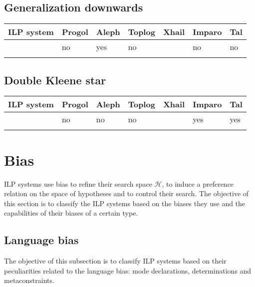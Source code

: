 \subsection{Generalization downwards}
\begin{center}
 \label{tab:title} 
\begin{tabular}{| l | l | l | l | l | l | l |}
    \hline
    ILP system & Progol & Aleph & Toplog & Xhail & Imparo & Tal \\ \hline
    & no & yes & no &  & no & no \\ \hline
    & & & & & & \\ \hline
\end{tabular}
\end{center}

\subsection{Double Kleene star}
\begin{center}
 \label{tab:title} 
\begin{tabular}{| l | l | l | l | l | l | l |}
    \hline
    ILP system & Progol & Aleph & Toplog & Xhail & Imparo & Tal \\ \hline
    & no & no & no & & yes & yes \\ \hline
    & & & & & & \\ \hline
\end{tabular}
\end{center}

\section{Bias}
ILP systems use bias to refine their search space $\mathcal{H}$, to induce a preference relation on the space of hypotheses and to control their search. The objective of this section is to classify the ILP systems based on the biases they use and the capabilities of their biases of a certain type.

\subsection{Language bias}\label{subsec:classification_language_bias}
The objective of this subsection is to classify ILP systems based on their peculiarities related to the language bias: mode declarations, determinations and metaconstraints.

